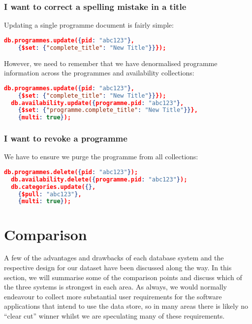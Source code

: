 \documentclass[11pt,a4paper]{article}
\begin{document}
\subsubsection{I want to correct a spelling mistake in a title}

Updating a single programme document is fairly simple:

\begin{lstlisting}[language=json]
  db.programmes.update({pid: "abc123"},
    {$set: {"complete_title": "New Title"}}});
\end{lstlisting}

However, we need to remember that we have denormalised programme
information across the programmes and availability collections:

\begin{lstlisting}[language=json]
  db.programmes.update({pid: "abc123"},
    {$set: {"complete_title": "New Title"}}});
  db.availability.update({programme.pid: "abc123"},
    {$set: {"programme.complete_title": "New Title"}}},
    {multi: true});
\end{lstlisting}

\subsubsection{I want to revoke a programme}

We have to ensure we purge the programme from all collections:

\begin{lstlisting}[language=json]
  db.programmes.delete({pid: "abc123"});
  db.availability.delete({programme.pid: "abc123"});
  db.categories.update({},
    {$pull: "abc123"},
    {multi: true});
\end{lstlisting}

\section{Comparison}

A few of the advantages and drawbacks of each database system
and the respective design for our dataset have been discussed along
the way. In this section, we will summarise some of the comparison
points and discuss which of the three systems is strongest in each
area. As always, we would normally endeavour to collect more
substantial user requirements for the software applications
that intend to use the data store, so in many areas there
is likely no ``clear cut'' winner whilst we are speculating many
of these requirements.
\end{document}
